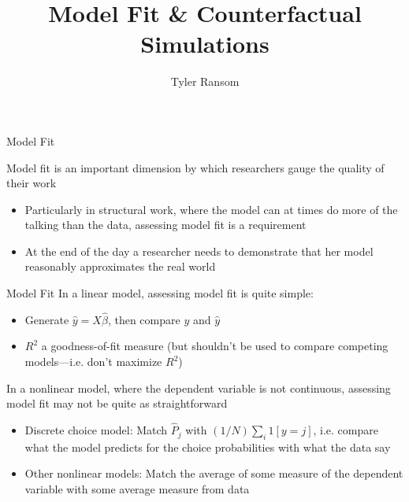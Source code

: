 \documentclass[english,xcolor=dvipsnames]{beamer}
\begin{document}
\begin{frame}
\title{Model Fit \& Counterfactual Simulations}


\author{Tyler Ransom}



\titlepage

\end{frame}


\begin{frame}{Model Fit}

Model fit is an important dimension by which researchers gauge the
quality of their work
\begin{itemize}
\item Particularly in structural work, where the model can at times do more
of the talking than the data, assessing model fit is a requirement
\item At the end of the day a researcher needs to demonstrate that her model
reasonably approximates the real world
\end{itemize}
\end{frame}

\begin{frame}{Model Fit}
In a linear model, assessing model fit is quite simple:
\begin{itemize}
\item Generate $\hat{y}=X\hat{\beta}$, then compare $y$ and $\hat{y}$
\item $R^{2}$ a goodness-of-fit measure (but shouldn't be used to compare
competing models---i.e. don't maximize $R^{2}$)
\end{itemize}
In a nonlinear model, where the dependent variable is not continuous,
assessing model fit may not be quite as straightforward
\begin{itemize}
\item Discrete choice model: Match $\hat{P}_{j}$ with $\left(1/N\right)\sum_{i}1\left[y=j\right]$,
i.e. compare what the model predicts for the choice probabilities
with what the data say
\item Other nonlinear models: Match the average of some measure of the dependent
variable with some average measure from data
\end{itemize}

\end{frame}
\end{document}
